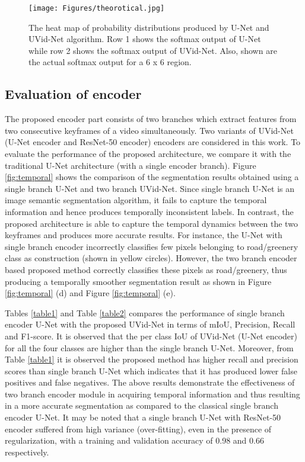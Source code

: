 \documentclass[journal]{IEEEtran}
\begin{document}
\begin{figure}[h]
	\begin{center}
		\texttt{[image: Figures/theorotical.jpg]}
	\end{center}
	\caption{The heat map of probability distributions produced by U-Net and UVid-Net algorithm. Row 1 shows the softmax output of U-Net while row 2 shows the softmax output of UVid-Net. Also, shown are the actual softmax output for a 6 x 6 region.}
	\label{fig:encoder}
\end{figure}

\subsection{Evaluation of encoder}
\label{Sec:TempInfo}


The proposed encoder part consists of two branches which extract features from two consecutive keyframes of a video simultaneously.  Two variants of UVid-Net (U-Net encoder and ResNet-50 encoder) encoders are considered in this work. To evaluate the performance of the proposed architecture, we compare it with the traditional U-Net architecture (with a single encoder branch). Figure \ref{fig:temporal} shows the comparison of the segmentation results obtained using a single branch U-Net and two branch UVid-Net. Since single branch U-Net is an image semantic segmentation algorithm, it fails to capture the temporal information and hence produces temporally inconsistent labels. In contrast, the proposed architecture is able to capture the temporal dynamics between the two keyframes and produces more accurate results. For instance, the U-Net with single branch encoder incorrectly classifies few pixels belonging to road/greenery class as construction (shown in yellow circles).   However, the two branch encoder based proposed method correctly classifies these pixels as road/greenery, thus producing a temporally smoother segmentation result as shown in Figure \ref{fig:temporal} (d) and Figure \ref{fig:temporal} (e). 



Tables \ref{table1} and Table  \ref{table2} compares the performance of single branch encoder U-Net with the proposed UVid-Net in terms of mIoU, Precision, Recall and F1-score. It is observed that the per class IoU of UVid-Net (U-Net encoder) for all the four classes are higher than the single branch U-Net. Moreover, from Table \ref{table1} it is observed the proposed method has higher recall and precision scores than single branch U-Net which indicates that it has produced lower false positives and false negatives. The above results demonstrate the effectiveness of two branch encoder module in acquiring temporal information and thus resulting in a more accurate segmentation as compared to the classical single branch encoder U-Net. It may be noted that a single branch U-Net with ResNet-50 encoder suffered from high variance (over-fitting), even in the presence of regularization, with a training and validation accuracy of 0.98 and 0.66 respectively.  
\end{document}
